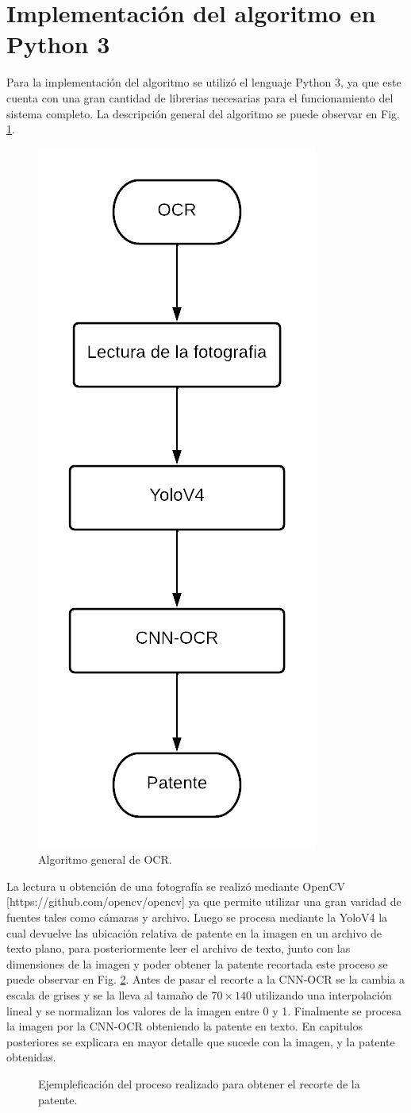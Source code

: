 \section{Implementación del algoritmo en Python 3}

Para la implementación del algoritmo se utilizó el lenguaje Python 3, ya que este cuenta con una gran cantidad de librerias necesarias para el funcionamiento del sistema completo. La descripción general del algoritmo se puede observar en Fig. \ref{fig:algoritmo-ocr}.

\begin{figure}
    \centering
    \includegraphics[width=.25\textwidth]{imgs/flujo-algoritmo-ocr.png}
    \caption{Algoritmo general de OCR.}
    \label{fig:algoritmo-ocr}
\end{figure}

La lectura u obtención de una fotografía se realizó mediante OpenCV [https://github.com/opencv/opencv] ya que permite utilizar una gran varidad de fuentes tales como cámaras y archivo. Luego se procesa mediante la YoloV4 la cual devuelve las ubicación relativa de patente en la imagen en un archivo de texto plano, para posteriormente leer el archivo de texto, junto con las dimensiones de la imagen y poder obtener la patente recortada este proceso se puede observar en Fig. \ref{fig:yolo-car-to-plate}. Antes de pasar el recorte a la CNN-OCR se la cambia a escala de grises y se la lleva al tamaño de $70 \times 140$ utilizando una interpolación lineal y se normalizan los valores de la imagen entre 0 y 1. Finalmente se procesa la imagen por la CNN-OCR obteniendo la patente en texto. En capitulos posteriores se explicara en mayor detalle que sucede con la imagen, y la patente obtenidas.

\begin{figure}
    \centering

    \caption{Ejempleficación del proceso realizado para obtener el recorte de la patente.}
    \label{fig:yolo-car-to-plate}
\end{figure}







